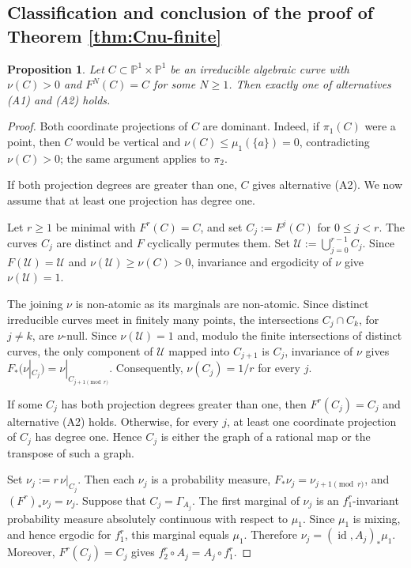 \documentclass[11pt]{amsart}
\numberwithin{equation}{section}
\theoremstyle{plain}
\newtheorem{prop}[thm]{Proposition}
\theoremstyle{definition}
\theoremstyle{remark}
\begin{document}
\subsection{Classification and conclusion of the proof of Theorem \ref{thm:Cnu-finite}}
\label{subsec:finite-classification}

\begin{prop}\label{prop:finite-case-classification}
Let $C\subset\mathbb P^1\times\mathbb P^1$ be an irreducible
algebraic curve with $\nu(C)>0$ and $F^N(C)=C$ for some $N\geq1$.
Then exactly one of alternatives \textup{(A1)} and \textup{(A2)}
holds.
\end{prop}

\begin{proof}
Both coordinate projections of $C$ are dominant. Indeed, if
$\pi_1(C)$ were a point, then $C$ would be vertical and
$\nu(C)\leq\mu_1(\{a\})=0$, contradicting $\nu(C)>0$; the same
argument applies to $\pi_2$.

If both projection degrees are greater than one, $C$ gives
alternative \textup{(A2)}. 
We now assume that at least one
projection has degree one.

Let $r\ge1$ be minimal with $F^r(C)=C$, and set
$C_j:=F^j(C)$ for $0\le j<r$. The curves $C_j$ are distinct and
$F$ cyclically permutes them. Set $\mathcal U:=\bigcup_{j=0}^{r-1}C_j$.
Since $F(\mathcal U)=\mathcal U$ and $\nu(\mathcal U)\ge\nu(C)>0$,
invariance and ergodicity of $\nu$ give $\nu(\mathcal U)=1$.

The joining $\nu$ is non-atomic as its marginals are
non-atomic. Since distinct irreducible curves meet in finitely many
points, the intersections $C_j\cap C_k$, for $j\ne k$, are
$\nu$-null. Since $\nu(\mathcal U)=1$ and, modulo the finite intersections of
distinct curves, the only component of $\mathcal U$ mapped into
$C_{j+1}$ is $C_j$, invariance of $\nu$ gives
$F_*(\nu|_{C_j})=\nu|_{C_{j+1\!\!\!\pmod r}}$. Consequently,
$\nu(C_j)=1/r$ for every $j$.

If some $C_j$ has both projection degrees greater than one, then
$F^r(C_j)=C_j$ and alternative (A2) holds. Otherwise, for every $j$,
at least one coordinate projection of $C_j$ has degree one. Hence
$C_j$ is either the graph of a rational map or the transpose of such
a graph.

Set $\nu_j:=r\,\nu|_{C_j}$. Then each $\nu_j$ is a probability
measure, $F_*\nu_j=\nu_{j+1\!\!\!\pmod r}$, and
$(F^r)_*\nu_j=\nu_j$. Suppose that $C_j=\Gamma_{A_j}$. The first
marginal of $\nu_j$ is an $f_1^r$-invariant probability measure
absolutely continuous with respect to $\mu_1$. Since $\mu_1$ is
mixing, and hence ergodic for $f_1^r$, this marginal equals $\mu_1$.
Therefore $\nu_j=(\operatorname{id},A_j)_*\mu_1$. Moreover,
$F^r(C_j)=C_j$ gives
$f_2^r\circ A_j=A_j\circ f_1^r$.


\end{proof}
\end{document}
